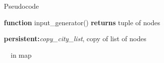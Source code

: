 \documentclass[12pt]{article}
\begin{document}
\begin{adjustwidth}{0.5in}{0.0in}
\begin{justify}
Pseudocode
\end{justify}\par

\end{adjustwidth}

\begin{adjustwidth}{0.5in}{0.0in}
\begin{justify}
{\fontsize{8pt}{9.6pt}\selectfont \textbf{function} input\_generator()\textbf{ returns} tuple of nodes  \tabto{0.75in} \tab \tab \tab \par}
\end{justify}\par

\end{adjustwidth}

\begin{adjustwidth}{0.5in}{0.0in}
\begin{justify}
 \tabto{0.75in} {\fontsize{8pt}{9.6pt}\selectfont \textbf{persistent:}\textit{copy\_city\_list}, copy of list of nodes\par}
\end{justify}\par

\end{adjustwidth}

\begin{adjustwidth}{0.5in}{0.0in}
\begin{justify}
{\fontsize{8pt}{9.6pt}\selectfont  \tabto{0.75in} \ \  \tab \tab in map\par}
\end{justify}\par

\end{adjustwidth}

\begin{adjustwidth}{0.5in}{0.0in}
\begin{justify}
 \tabto{0.75in} \tab {}
\end{justify}\par

\end{adjustwidth}

\begin{adjustwidth}{0.5in}{0.0in}
\begin{justify}
 \tabto{0.75in} \tab {}
\end{justify}\par

\end{adjustwidth}
\end{document}
